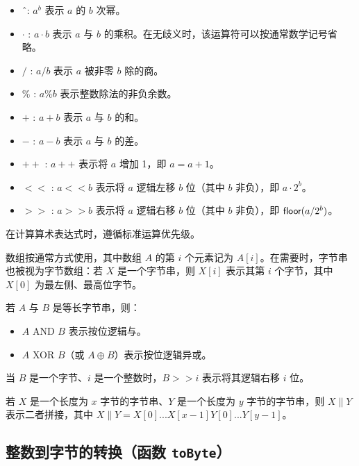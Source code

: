 \begin{itemize}
    \item \^\ : $a^b$ 表示 $a$ 的 $b$ 次幂。

    \item $\cdot$ : $a\cdot b$ 表示 $a$ 与 $b$ 的乘积。在无歧义时，该运算符可以按通常数学记号省略。

    \item $/$ : $a/b$ 表示 $a$ 被非零 $b$ 除的商。

    \item $\%$ : $a \% b$ 表示整数除法的非负余数。

    \item $+$ : $a+b$ 表示 $a$ 与 $b$ 的和。

    \item $-$ : $a-b$ 表示 $a$ 与 $b$ 的差。

    \item $++$ : $a++$ 表示将 $a$ 增加 1，即 $a = a + 1$。

    \item $<<$ : $a << b$ 表示将 $a$ 逻辑左移 $b$ 位（其中 $b$ 非负），即 $a \cdot 2^b$。

    \item $>>$ : $a >> b$ 表示将 $a$ 逻辑右移 $b$ 位（其中 $b$ 非负），即 $\textsf{floor}(a/2^b)$。
\end{itemize}

在计算算术表达式时，遵循标准运算优先级。

数组按通常方式使用，其中数组 $A$ 的第 $i$ 个元素记为 $A[i]$。在需要时，字节串也被视为字节数组：若 $X$ 是一个字节串，则 $X[i]$ 表示其第 $i$ 个字节，其中 $X[0]$ 为最左侧、最高位字节。

若 $A$ 与 $B$ 是等长字节串，则：

\begin{itemize}
    \item $A$ AND $B$ 表示按位逻辑与。

    \item $A$ XOR $B$（或 $A \oplus B$）表示按位逻辑异或。
\end{itemize}

当 $B$ 是一个字节、$i$ 是一个整数时，$B >> i$ 表示将其逻辑右移 $i$ 位。

若 $X$ 是一个长度为 $x$ 字节的字节串、$Y$ 是一个长度为 $y$ 字节的字节串，则 $X \| Y$ 表示二者拼接，其中 $X\|Y = X[0]...X[x-1] Y[0]...Y[y-1]$。

\subsection{整数到字节的转换（函数 \texttt{toByte}）}

